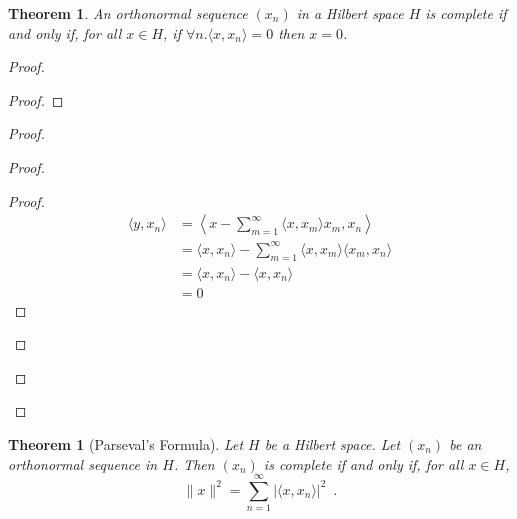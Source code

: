 \documentclass{book}
\let\qed\relax
\newtheorem{thm}[ax]{Theorem}
\theoremstyle{definition}
\begin{document}
\begin{thm}
An orthonormal sequence $(x_n)$ in a Hilbert space $H$ is complete if and only if, for all $x \in H$, if $\forall n. \langle x, x_n \rangle = 0$ then $x = 0$.
\end{thm}

\begin{proof}
\pf
{}
\begin{proof}
\end{proof}
\begin{proof}
	\begin{proof}
		\begin{proof}
			\pf
			\begin{align*}
				\langle y, x_n \rangle & = \left\langle x - \sum_{m=1}^\infty \langle x, x_m \rangle x_m , x_n \right\rangle \\
				& = \langle x, x_n \rangle - \sum_{m=1}^\infty \langle x, x_m \rangle \langle x_m, x_n \rangle \\
				& = \langle x, x_n \rangle - \langle x, x_n \rangle \\
				& = 0
			\end{align*}
		\end{proof}
	\end{proof}
\end{proof}
\qed
\end{proof}

\begin{thm}[Parseval's Formula]
Let $H$ be a Hilbert space. Let $(x_n)$ be an orthonormal sequence in $H$. Then $(x_n)$ is complete if and only if, for all $x \in H$,
\[ \| x \|^2 = \sum_{n=1}^\infty |\langle x, x_n \rangle|^2 \enspace . \]
\end{thm}
\end{document}
